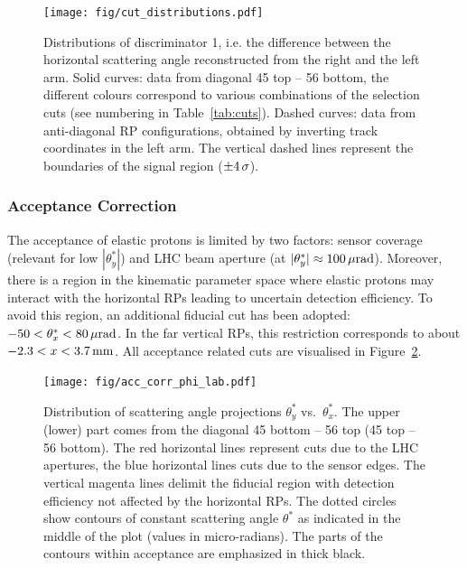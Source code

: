 \begin{figure}
\begin{center}
\texttt{[image: fig/cut\_distributions.pdf]}
\caption{%
Distributions of discriminator 1, i.e. the difference between the horizontal scattering angle reconstructed from the right and the left arm. Solid curves: data from diagonal 45 top -- 56 bottom, the different colours correspond to various combinations of the selection cuts (see numbering in Table~\ref{tab:cuts}). Dashed curves: data from anti-diagonal RP configurations, obtained by inverting track coordinates in the left arm. The vertical dashed lines represent the boundaries of the signal region ($\pm 4\,{\rm \sigma}$).
}
\label{fig:tag bckg}
\end{center}
\end{figure}


\subsubsection{Acceptance Correction}
\label{sec:acc corr}

The acceptance of elastic protons is limited by two factors: sensor coverage (relevant for low $|\theta^*_y|$) and LHC beam aperture (at $|\theta^*_y| \approx 100\,{\rm \mu rad}$). Moreover, there is a region in the kinematic parameter space where elastic protons may interact with the horizontal RPs leading to uncertain detection efficiency. To avoid this region, an additional fiducial cut has been adopted: $-50 < \theta_x^* < 80\,{\rm \mu rad}$. In the far vertical RPs, this restriction corresponds to about $-2.3 < x < 3.7\,{\rm mm}$. All acceptance related cuts are visualised in Figure~\ref{fig:acc corr princ}.

\begin{figure}
\begin{center}
\texttt{[image: fig/acc\_corr\_phi\_lab.pdf]}
\caption{%
Distribution of scattering angle projections $\theta_y^*$ vs.~$\theta_x^*$. The upper (lower) part comes from the diagonal 45 bottom -- 56 top (45 top -- 56 bottom). The red horizontal lines represent cuts due to the LHC apertures, the blue horizontal lines cuts due to the sensor edges. The vertical magenta lines delimit the fiducial region with detection efficiency not affected by the horizontal RPs. The dotted circles show contours of constant scattering angle $\theta^*$ as indicated in the middle of the plot (values in micro-radians). The parts of the contours within acceptance are emphasized in thick black.
}
\label{fig:acc corr princ}
\end{center}
\end{figure}

